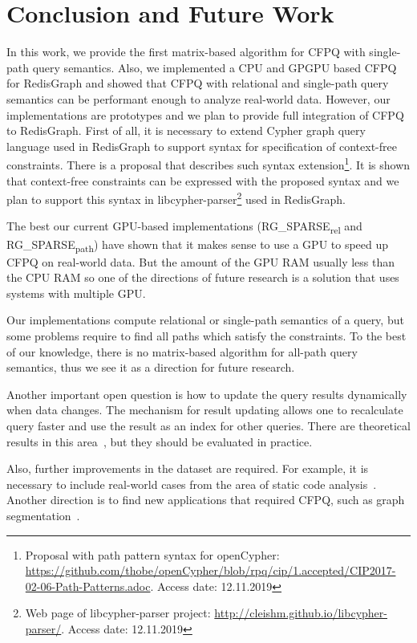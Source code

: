 \section{Conclusion and Future Work}
In this work, we provide the first matrix-based algorithm for CFPQ with single-path query semantics.
Also, we implemented a CPU and GPGPU based CFPQ for RedisGraph and showed that CFPQ with relational and single-path query semantics can be performant enough to analyze real-world data.
However, our implementations are prototypes and we plan to provide full integration of CFPQ to RedisGraph.
First of all, it is necessary to extend Cypher graph query language used in RedisGraph to support syntax for specification of context-free constraints.
There is a proposal that describes such syntax extension\footnote{Proposal with path pattern syntax for openCypher: \url{https://github.com/thobe/openCypher/blob/rpq/cip/1.accepted/CIP2017-02-06-Path-Patterns.adoc}. Access date: 12.11.2019}. It is shown that context-free constraints can be expressed with the proposed syntax and we plan to support this syntax in libcypher-parser\footnote{Web page of libcypher-parser project: \url{http://cleishm.github.io/libcypher-parser/}. Access date: 12.11.2019} used in RedisGraph.

The best our current GPU-based implementations (RG\_SPARSE\textsubscript{rel} and RG\_SPARSE\textsubscript{path}) have shown that it makes sense to use a GPU to speed up CFPQ on real-world data. But the amount of the GPU RAM usually less than the CPU RAM so one of the directions of future research is a solution that uses systems with multiple GPU.

Our implementations compute relational or single-path semantics of a query, but some problems require to find all paths which satisfy the constraints.
To the best of our knowledge, there is no matrix-based algorithm for all-path query semantics, thus we see it as a direction for future research.

Another important open question is how to update the query results dynamically when data changes.
The mechanism for result updating allows one to recalculate query faster and use the result as an index for other queries. There are theoretical results in this area~\cite{10.1007/978-3-662-54458-7_16}, but they should be evaluated in practice.

Also, further improvements in the dataset are required.
For example, it is necessary to include real-world cases from the area of static code analysis~\cite{Zheng:2008:DAA:1328897.1328464,veduradabatch,LPAR-21:Cauliflower_Solver_Generator_for}.
Another direction is to find new applications that required CFPQ, such as graph segmentation~\cite{8731467}. 
